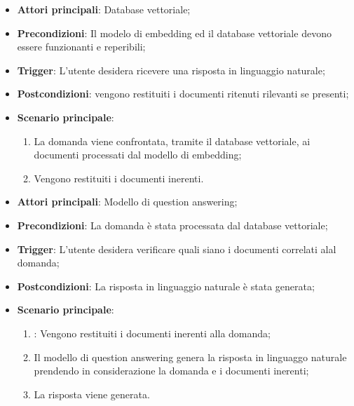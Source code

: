 \hypertarget{UC3.1}{}
\begin{itemize}
    \item \textbf{Attori principali}: Database vettoriale;
    \item \textbf{Precondizioni}: Il modelo di embedding ed il database vettoriale devono essere funzionanti e reperibili;
    \item \textbf{Trigger}: L'utente desidera ricevere una risposta in linguaggio naturale;
    \item \textbf{Postcondizioni}: vengono restituiti i documenti ritenuti rilevanti se presenti;
    \item \textbf{Scenario principale}:
    \begin{enumerate}
        \item La domanda viene confrontata, tramite il database vettoriale, ai documenti processati dal modello di embedding;
        \item Vengono restituiti i documenti inerenti.
    \end{enumerate}
\end{itemize}

\hypertarget{UC3.2}{}
\begin{itemize}
    \item \textbf{Attori principali}: Modello di question answering;
    \item \textbf{Precondizioni}: La domanda è stata processata dal database vettoriale;
    \item \textbf{Trigger}: L'utente desidera verificare quali siano i documenti correlati alal domanda;
    \item \textbf{Postcondizioni}: La risposta in linguaggio naturale è stata generata;
    \item \textbf{Scenario principale}:
    \begin{enumerate}
        \item {}: Vengono restituiti i documenti inerenti alla domanda;
        \item Il modello di question answering genera la risposta in linguaggo naturale prendendo in considerazione la domanda e i documenti inerenti;
        \item La risposta viene generata.
    \end{enumerate}
\end{itemize}


